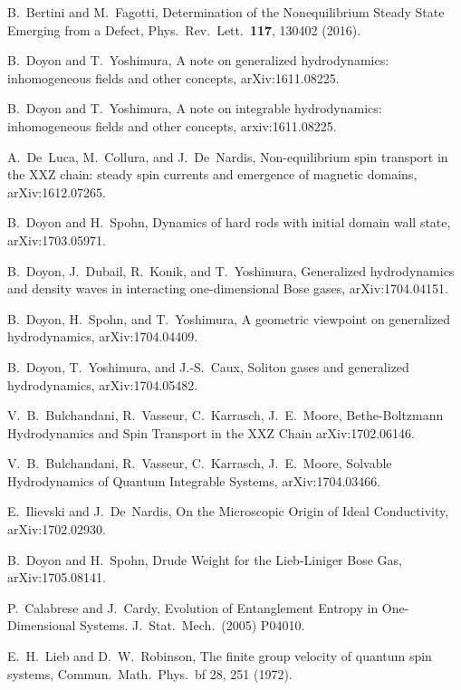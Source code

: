 \documentclass[twocolumn,superscriptaddress,prb,10pt]{revtex4-1}
\begin{document}
\begin{thebibliography}{99}
B.~Bertini and M.~Fagotti, Determination of the Nonequilibrium Steady State Emerging from a Defect, 
Phys.\ Rev.\ Lett.\ {\bf 117}, 130402 (2016). 


B.~Doyon and T.~Yoshimura, A note on generalized hydrodynamics: 
inhomogeneous fields and other concepts, arXiv:1611.08225. 

B.~Doyon and T.~Yoshimura, A note on integrable hydrodynamics: inhomogeneous fields and 
other concepts, arxiv:1611.08225. 


A.~De~Luca, M.~Collura, and J.~De~Nardis, 
Non-equilibrium spin transport in the XXZ chain: steady spin currents and emergence of magnetic domains, 
arXiv:1612.07265. 

B.~Doyon and H.~Spohn, Dynamics of hard rods with initial domain wall state, 
arXiv:1703.05971. 

B.~Doyon, J.~Dubail, R.~Konik, and T.~Yoshimura, 
Generalized hydrodynamics and density waves in interacting one-dimensional Bose gases, 
arXiv:1704.04151. 

B.~Doyon, H.~Spohn, and T.~Yoshimura, 
A geometric viewpoint on generalized hydrodynamics, 
arXiv:1704.04409. 

B.~Doyon, T.~Yoshimura, and J.-S.~Caux, 
Soliton gases and generalized hydrodynamics, 
arXiv:1704.05482. 


V.~B.~Bulchandani, R.~Vasseur, C.~Karrasch, J.~E.~Moore, 
Bethe-Boltzmann Hydrodynamics and Spin Transport in the XXZ Chain
arXiv:1702.06146. 

V.~B.~Bulchandani, R.~Vasseur, C.~Karrasch, J.~E.~Moore, 
Solvable Hydrodynamics of Quantum Integrable Systems, 
arXiv:1704.03466. 

E.~Ilievski and J.~De~Nardis, 
On the Microscopic Origin of Ideal Conductivity, 
arXiv:1702.02930. 

         B.~Doyon and H.~Spohn, 
         Drude Weight for the Lieb-Liniger Bose Gas, 
	 arXiv:1705.08141.

	P.~Calabrese and J.~Cardy, 
	Evolution of Entanglement Entropy in One-Dimensional Systems.
	J.\ Stat.\ Mech.\ (2005) P04010.


E.~H.~Lieb and D.~W.~Robinson, The finite group velocity of quantum 
spin systems, Commun.\ Math.\ Phys.\ {bf 28}, 251 (1972).



\end{thebibliography}
\end{document}
